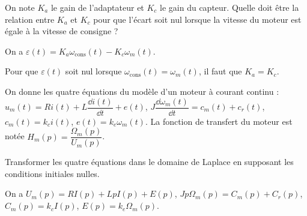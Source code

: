 \begin{question}
On note $K_a$ le gain de l'adaptateur et $K_c$ le gain du capteur. Quelle doit être la relation entre 
$K_a$ et $K_c$ pour que l'écart soit nul lorsque la vitesse du moteur est égale à la vitesse de consigne ?
\end{question}
\ifprof
\begin{corrige}
On a $\varepsilon(t) = K_a \omega_{\text{cons}}(t) - K_c \omega_m(t)$. 

Pour que $\varepsilon(t)$ soit nul lorsque $\omega_{\text{cons}}(t) =  \omega_m(t)$, il faut que 
$K_a = K_c$.

\end{corrige}
\else
\fi

\ifprof
\else
On donne les quatre équations du modèle d’un moteur à courant continu :
$u_m(t) = Ri(t) + L \dfrac{\dd i(t)}{\dd t} + e(t)$, 
$J \dfrac{\dd \omega_m(t)}{\dd t} = c_m(t) + c_r(t)$, 
$c_m(t) = k_c i(t)$, $e(t) = k_e\omega_m(t)$.
La fonction de transfert du moteur est notée $H_m(p)=\dfrac{\Omega_m(p)}{U_m(p)}$.
\fi

\ifprof
\else
{}
\fi

\begin{question}
Transformer les quatre équations dans le domaine de Laplace en supposant les conditions
initiales nulles.
\end{question}
\ifprof
\begin{corrige}
On a $U_m(p) = RI(p) + L pI(p) + E(p)$, 
$J p\Omega_m(p) = C_m(p) + C_r(p)$, 
$C_m(p) = k_c I(p)$, 
$E(p) = k_e\Omega_m(p)$.
\end{corrige}
\else
\fi




